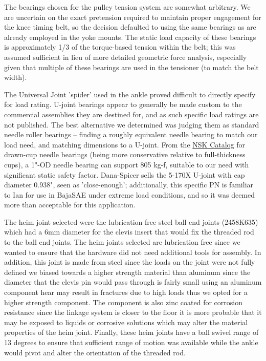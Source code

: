 \documentclass{article}
\begin{document}
The bearings chosen for the pulley tension system are somewhat arbitrary. We are uncertain on the exact pretension required to maintain proper engagement for the knee timing belt, so the decision defaulted to using the same bearings as are already employed in the yoke mounts. The static load capacity of these bearings is approximately 1/3 of the torque-based tension within the belt; this was assumed sufficient in lieu of more detailed geometric force analysis, especially given that multiple of these bearings are used in the tensioner (to match the belt width).

The Universal Joint 'spider' used in the ankle proved difficult to directly specify for load rating. U-joint bearings appear to generally be made custom to the commercial assemblies they are destined for, and as such specific load ratings are not published. The best alternative we determined was judging them as standard needle roller bearings -- finding a roughly equivalent needle bearing to match our load need, and matching dimensions to a U-joint. From the \href{https://www.nsk.com/content/dam/nsk/am/en_us/documents/Needle_Roller_Bearings.pdf}{NSK Catalog} for drawn-cup needle bearings (being more conservative relative to full-thickness cups), a 1"-OD needle bearing can support 805 kg-f, suitable to our need with significant static safety factor. Dana-Spicer sells the 5-170X U-joint with cap diameter 0.938", seen as 'close-enough'; additionally, this specific PN is familiar to Ian for use in BajaSAE under extreme load conditions, and so it was deemed more than acceptable for this application.

 The heim joint selected were the lubrication free steel ball end joints (2458K635) which had a 6mm diameter for the clevis insert that would fix the threaded rod to the ball end joints. The heim joints selected are lubrication free since we wanted to ensure that the hardware did not need additional tools for assembly. In addition, this joint is made from steel since the loads on the joint were not fully defined we biased towards a higher strength material than aluminum since the diameter that the clevis pin would pass through is fairly small using an aluminum component hear may result in fractures due to high loads thus we opted for a higher strength component. The component is also zinc coated for corrosion resistance since the linkage system is closer to the floor it is more probable that it may be exposed to liquids or corrosive solutions which may alter the material properties of the heim joint. Finally, these heim joints have a ball swivel range of 13 degrees to ensure that sufficient range of motion was available while the ankle would pivot and alter the orientation of the threaded rod. 
\end{document}
